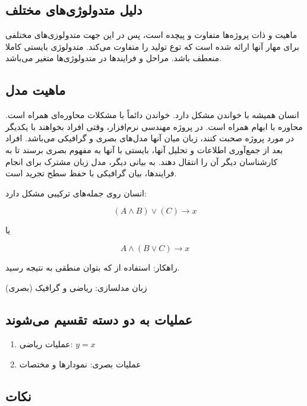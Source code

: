 \subsection{دلیل متدولوژی‌های مختلف}

ماهیت و ذات پروژه‌ها متفاوت و پیچده‌ است، پس در این جهت متدولوزی‌های مختلفی برای
مهار آنها ارائه شده است که توع تولید را متفاوت می‌کند. متدولوژی بایستی کاملا
منعطف باشد. مراحل و فرایند‌ها در متدولوژی‌ها متغیر می‌باشد.

\subsection{ماهیت مدل}

انسان همیشه با خواندن مشکل دارد. خواندن دائماً با مشکلات محاوره‌ای همراه است.
محاوره با ابهام همراه است. در پروژه مهندسی نرم‌افزار، وقتی افراد بخواهند با
یکدیگر در مورد پروژه صحبت کنند، زبان میان آنها مدل‌های بصری و گرافیکی می‌باشد.
افراد بعد از جمع‌آوری اطلاعات و تحلیل آنها، بایستی با آنها به مفهوم بصری برسند
تا به کارشناسان دیگر آن را انتقال دهند. به بیانی دیگر، مدل زبان مشترک برای انجام
فرایند‌ها، بیان گرافیکی با حفظ سطح تجرید است.

انسان روی جمله‌های ترکیبی مشکل دارد: 

\begin{equation}
  (A \wedge  B)\vee (C) \rightarrow x
\end{equation}

یا

\begin{equation}
  A \wedge (B \vee C) \rightarrow x
\end{equation}

راهکار: استفاده از  که بتوان منطقی به نتیجه رسید.

زبان مدلسازی: ریاضی و گرافیک (بصری)

\subsection*{عملیات به دو دسته تقسیم می‌شوند}

\begin{enumerate}
  \item عملیات ریاضی: $y = x$
  \item عملیات بصری: نمودار‌ها و مختصات
\end{enumerate}

\subsection*{نکات}

